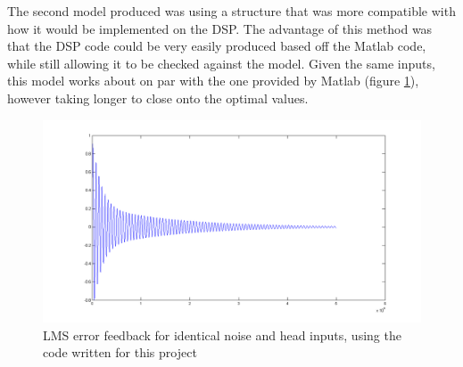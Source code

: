 \noindent The second model produced was using a structure that was more compatible with how it would be implemented on the DSP.
The advantage of this method was that the DSP code could be very easily produced based off the Matlab code, while still allowing it to be checked against the model.
Given the same inputs, this model works about on par with the one provided by Matlab (figure \ref{fig:modellmscancelmine}), however taking longer to close onto the optimal values.

\begin{figure}[H]
	\centering
	\includegraphics[width=\textwidth]{./img/lmssnr_cancel_mine.png}
	\caption{LMS error feedback for identical noise and head inputs, using the code written for this project}
	\label{fig:modellmscancelmine}
\end{figure}

